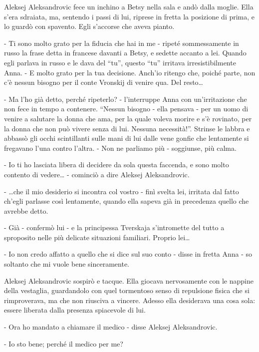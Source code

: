 \label{xx-3} 

Aleksej Aleksandrovic fece un inchino a Betsy nella sala e andò dalla moglie. Ella s'era sdraiata, ma, sentendo i passi di lui, riprese in fretta la posizione di prima, e lo guardò con spavento. Egli s'accorse che aveva pianto. 

- Ti sono molto grato per la fiducia che hai in me - ripeté sommessamente in russo la frase detta in francese davanti a Betsy, e sedette accanto a lei. Quando egli parlava in russo e le dava del ``tu'', questo ``tu'' irritava irresistibilmente Anna. - E molto grato per la tua decisione. Anch'io ritengo che, poiché parte, non c'è nessun bisogno per il conte Vronskij di venire qua. Del resto\ldots{} 

- Ma l'ho già detto, perché ripeterlo? - l'interruppe Anna con un'irritazione che non fece in tempo a contenere. ``Nessun bisogno - ella pensava - per un uomo di venire a salutare la donna che ama, per la quale voleva morire e s'è rovinato, per la donna che non può vivere senza di lui. Nessuna necessità!''. Strinse le labbra e abbassò gli occhi scintillanti sulle mani di lui dalle vene gonfie che lentamente si fregavano l'una contro l'altra. - Non ne parliamo più - soggiunse, più calma. 

- Io ti ho lasciata libera di decidere da sola questa faccenda, e sono molto contento di vedere\ldots{} - cominciò a dire Aleksej Aleksandrovic. 

- \ldots{}che il mio desiderio si incontra col vostro - finì svelta lei, irritata dal fatto ch'egli parlasse così lentamente, quando ella sapeva già in precedenza quello che avrebbe detto. 

- Già - confermò lui - e la principessa Tverskaja s'intromette del tutto a sproposito nelle più delicate situazioni familiari. Proprio lei\ldots{} 

- Io non credo affatto a quello che si dice sul suo conto - disse in fretta Anna - so soltanto che mi vuole bene sinceramente. 

Aleksej Aleksandrovic sospirò e tacque. Ella giocava nervosamente con le nappine della vestaglia, guardandolo con quel tormentoso senso di repulsione fisica che si rimproverava, ma che non riusciva a vincere. Adesso ella desiderava una cosa sola: essere liberata dalla presenza spiacevole di lui. 

- Ora ho mandato a chiamare il medico - disse Aleksej Aleksandrovic. 

- Io sto bene; perché il medico per me? 

